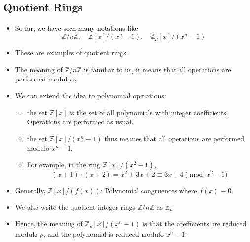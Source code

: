 \subsection{Quotient Rings}
\begin{frame}
    \begin{itemize}
        \item <1->So far, we have seen many notations like 
            \[ \mathbb{Z}/ n\mathbb{Z}, \quad \mathbb{Z}[x]/(x^n - 1), \quad \mathbb{Z}_{p}[x]/(x^n - 1)  \]
        \item <2->These are examples of quotient rings. 
        \item <3->The meaning of \( \mathbb{Z}/n\mathbb{Z} \) is familiar to us, 
              it means that all operations are performed modulo \(n\).
        \item <4->We can extend the idea to polynomial operations: 
              \begin{itemize}
                   \item the set \( \mathbb{Z}[x] \) is the set of all polynomials 
                         with integer coefficients. 
                         Operations are performed as usual.
                   \item the set \( \mathbb{Z}[x]/(x^n - 1) \) thus meanes that 
                         all operations are performed modulo \(x^n - 1\).
                   \item For example, in the ring \( \mathbb{Z}[x]/(x^2 - 1) \), 
                       \[ (x + 1) \cdot (x + 2) = x^2 + 3x + 2 \equiv 3x + 4 \pmod{x^2 - 1} \]
              \end{itemize}
 
        \item <5->Generally, \(\mathbb{Z}[x]/(f(x))\): Polynomial congruences where \(f(x) \equiv 0\).
        \item <6->We also write the quotient integer rings \(\mathbb{Z} / n\mathbb{Z}\) as \(\mathbb{Z}_n\)
        \item <7->Hence, the meaning of \(\mathbb{Z}_{p}[x]/(x^n - 1)\) 
              is that the coefficients are reduced modulo \(p\),
              and the polynomial is reduced modulo \(x^n - 1\).
  \end{itemize}
\end{frame}


